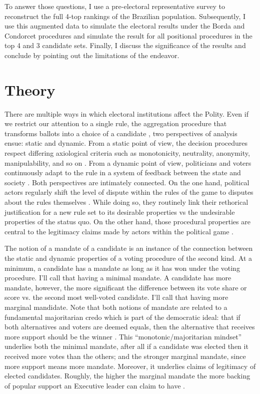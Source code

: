 \documentclass[hidelinks,11pt]{article}
\begin{document}
To answer those questions, I use a pre-electoral representative survey to
reconstruct the full 4-top rankings of the Brazilian population. Subsequently, I
use this augmented data to simulate the electoral results under the Borda and
Condorcet procedures and simulate the result for all positional procedures in
the top 4 and 3 candidate sets. Finally, I discuss the significance of the
results and conclude by pointing out the limitations of the endeavor.


\section{Theory}
There are multiple ways in which electoral institutions affect the Polity. Even
if we restrict our attention to a single rule, the aggregation procedure that
transforms ballots into a choice of a candidate \parencite{Goodin_2006}, two
perspectives of analysis ensue: static and dynamic. From a static point of view,
the decision procedures respect differing axiological criteria such as
monotonicity, neutrality, anonymity, manipulability, and so on
\parencite{nurmi1999voting}. From a dynamic point of view, politicians and
voters continuously adapt to the rule in a system of feedback between the state
and society \parencite{Wange2021systems}. Both perspectives are intimately
connected. On the one hand, political actors regularly shift the level of dispute
within the rules of the game to disputes about the rules themselves
\parencite{ostrom2009understanding}. While doing so, they routinely link their
rethorical justification for a new rule set to its desirable properties vs the
undesirable properties of the status quo. On the other hand, those procedural
properties are central to the legitimacy claims made by actors within the
political game \parencite{patty2014social}.

The notion of a mandate of a candidate is an instance of the connection between
the static and dynamic properties of a voting procedure of the second kind. At a
minimum, a candidate has a mandate as long as it has won under the voting
procedure. I'll call that having a minimal mandate. A candidate has more
mandate, however, the more significant the difference between its vote share or
score vs. the second most well-voted candidate. I'll call that having more
marginal mandidate. Note that both notions of mandate are related to a
fundamental majoritarian credo which is part of the democratic ideal: that if
both alternatives and voters are deemed equals, then the alternative that
receives more support should be the winner \parencite{dahl1989democracy}. This
``monotonic/majoritarian mindset'' underlies both the minimal mandate, after all
if a candidate was elected then it received more votes than the others; and the
stronger marginal mandate, since more support means more mandate. Moreover, it
underlies claims of legitimacy of elected candidates. Roughly, the higher the
marginal mandate the more backing of popular support an Executive leader can
claim to have \parencite{grossman2022majoritarian}.
\end{document}
